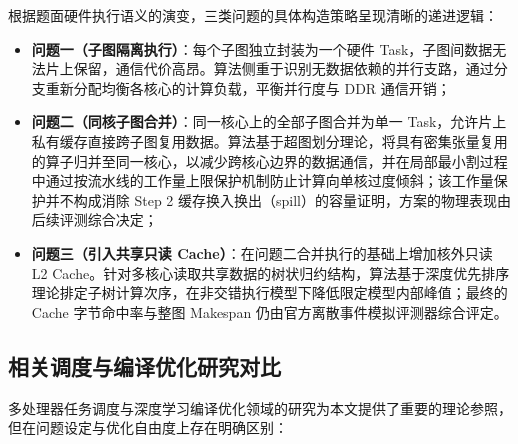 \documentclass[anonymous,notoc]{gmcm2026}
\providecommand{\tightlist}{\setlength{\itemsep}{0pt}\setlength{\parskip}{0pt}}
\begin{document}
根据题面硬件执行语义的演变，三类问题的具体构造策略呈现清晰的递进逻辑：

\begin{itemize}
\tightlist
\item
  \textbf{问题一（子图隔离执行）}：每个子图独立封装为一个硬件 Task，子图间数据无法片上保留，通信代价高昂。算法侧重于识别无数据依赖的并行支路，通过分支重新分配均衡各核心的计算负载，平衡并行度与 DDR 通信开销；
\item
  \textbf{问题二（同核子图合并）}：同一核心上的全部子图合并为单一 Task，允许片上私有缓存直接跨子图复用数据。算法基于超图划分理论，将具有密集张量复用的算子归并至同一核心，以减少跨核心边界的数据通信，并在局部最小割过程中通过按流水线的工作量上限保护机制防止计算向单核过度倾斜；该工作量保护并不构成消除 Step 2 缓存换入换出（spill）的容量证明，方案的物理表现由后续评测综合决定；
\item
  \textbf{问题三（引入共享只读 Cache）}：在问题二合并执行的基础上增加核外只读 L2 Cache。针对多核心读取共享数据的树状归约结构，算法基于深度优先排序理论排定子树计算次序，在非交错执行模型下降低限定模型内部峰值；最终的 Cache 字节命中率与整图 Makespan 仍由官方离散事件模拟评测器综合评定。
\end{itemize}

\subsection{相关调度与编译优化研究对比}

多处理器任务调度与深度学习编译优化领域的研究为本文提供了重要的理论参照，但在问题设定与优化自由度上存在明确区别：
\end{document}
